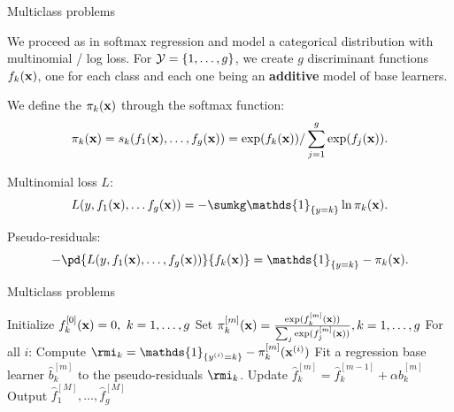 \documentclass[11pt,compress,t,notes=noshow, xcolor=table]{beamer}
\begin{document}
\begin{frame2}{Multiclass problems}

We proceed as in softmax regression and model a categorical distribution with multinomial / log loss.
For $\mathcal{Y} = \{1, \ldots, g\}$, we create $g$ discriminant functions $f_{k}(\mathbf{x})$, one for each class and each one being an \textbf{additive} model of base learners.

We define the $\pi_k(\mathbf{x})$ through the softmax function:
$$ \pi_{k}(\mathbf{x}) = s_k(f_1(\mathbf{x}), \ldots, f_g(\mathbf{x})) = \exp(f_{k}(\mathbf{x})) / \sum_{j=1}^g \exp(f_j(\mathbf{x})). $$

Multinomial loss $L$:
$$ L(y, f_1(\xv), \ldots f_g(\xv)) = - \sumkg \mathds{1}_{\{y = k\}} \ln \pikx. $$

Pseudo-residuals:
$$-\pd{L(y, f_1(\xv), \ldots, f_g(\xv))}{\fkx} =  \mathds{1}_{\{y = k\}} - \pikx. $$


\end{frame2}
\begin{frame2}{Multiclass problems}

\begin{algorithm}[H]
  \begin{footnotesize}
  \begin{center}
  \caption{GB for Multiclass}
    \begin{algorithmic}[1]
      \State Initialize $f_{k}^{[0]}(\mathbf{x}) = 0,\ k = 1,\ldots,g$
      \State Set $\pi_{k}^{[m]}(\mathbf{x}) = \frac{\exp(f_k^{[m]}(\mathbf{x}))}{\sum_j \exp(f_j^{[m]}(\mathbf{x}))}, k = 1,\ldots,g$
            \State For all $i$: Compute $\rmi_k = \mathds{1}_{\{\yi = k\}} - \pik^{[m]}(\xi)$
              \State Fit a regression base learner $\hat{b}^{[m]}_k$ to the pseudo-residuals $\rmi_k$.
              \State Update $\hat{f}_k^{[m]} = \hat{f}_k^{[m-1]} + \alpha \hat{b}^{[m]}_k$
            \EndFor
      \EndFor
    \State Output $\hat{f}_1^{[M]}, \ldots, \hat{f}_g^{[M]}$
    \end{algorithmic}
    \end{center}
    \end{footnotesize}
\end{algorithm}

\end{frame2}

	
	
\end{document}
